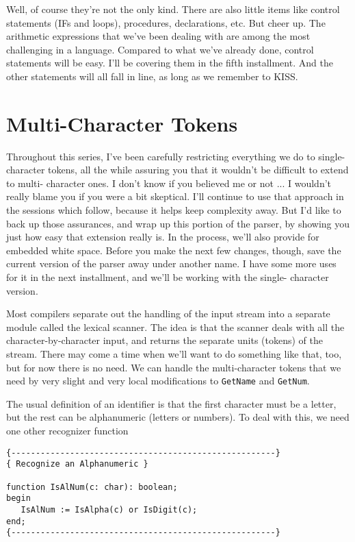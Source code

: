 Well, of course they're not the only kind. There are also little items  like  control  statements  (IFs  and  loops), procedures, declarations, etc. But cheer  up. The  arithmetic expressions that we've been dealing with are among the most challenging  in a language. Compared  to  what  we've  already  done, control statements  will be easy. I'll be covering  them  in  the  fifth installment. And the other statements will all fall in  line, as long as we remember to KISS.

\section{Multi-Character Tokens}

Throughout  this   series, I've   been   carefully  restricting everything  we  do  to  single-character  tokens, all  the while assuring  you  that  it wouldn't be difficult to extend to multi- character ones. I  don't  know if you believed me or not ... I wouldn't  really blame you if you were a  bit  skeptical. I'll continue  to use  that approach in  the  sessions  which  follow, because it helps keep complexity away. But I'd like to back up those  assurances, and wrap up this portion  of  the  parser, by showing you  just  how  easy  that  extension  really is. In the process, we'll also provide for embedded white space. Before you make  the  next  few changes, though, save the current version of the parser away under another name. I have some more uses for it in  the  next  installment, and we'll be working with the single- character version.

Most compilers separate out the handling of the input stream into a separate module called  the  lexical scanner. The idea is that the scanner deals with all the character-by-character  input, and returns the separate units  (tokens)  of  the  stream. There may come a time when we'll want  to  do something like that, too, but for  now  there  is  no  need. We can handle the  multi-character tokens that we need by very slight and  very  local modifications to {\tt GetName} and {\tt GetNum}.

The usual definition of an identifier is that the first character must be a letter, but the rest can be  alphanumeric  (letters  or numbers). To  deal  with  this, we  need  one  other recognizer function

\begin{verbatim}
{------------------------------------------------------}
{ Recognize an Alphanumeric }

function IsAlNum(c: char): boolean;
begin
   IsAlNum := IsAlpha(c) or IsDigit(c);
end;
{------------------------------------------------------}
\end{verbatim}

